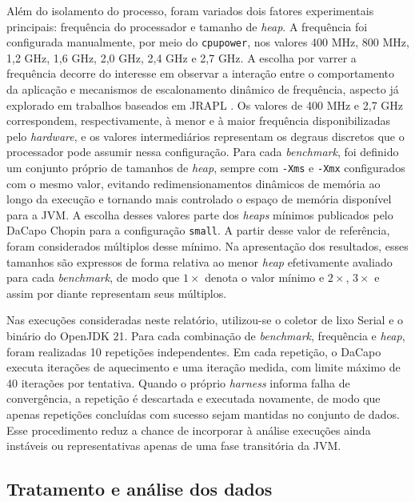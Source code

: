 Além do isolamento do processo, foram variados dois fatores experimentais
principais: frequência do processador e tamanho de \textit{heap}. A frequência
foi configurada manualmente, por meio do \texttt{cpupower}, nos valores
400 MHz, 800 MHz, 1{,}2 GHz, 1{,}6 GHz, 2{,}0 GHz, 2{,}4 GHz e 2{,}7 GHz. A
escolha por varrer a frequência decorre do interesse em observar a interação
entre o comportamento da aplicação e mecanismos de escalonamento dinâmico de
frequência, aspecto já explorado em trabalhos baseados em JRAPL \cite{jrapl}.
Os valores de 400 MHz e 2{,}7 GHz correspondem, respectivamente, à menor e à maior
frequência disponibilizadas pelo \textit{hardware}, e os
valores intermediários representam os degraus discretos que o processador pode
assumir nessa configuração. Para cada \textit{benchmark}, foi definido um
conjunto próprio de tamanhos de \textit{heap}, sempre com \texttt{-Xms} e
\texttt{-Xmx} configurados com o mesmo valor, evitando redimensionamentos
dinâmicos de memória ao longo da execução e tornando mais controlado o espaço
de memória disponível para a JVM. A escolha desses valores parte dos
\textit{heaps} mínimos publicados pelo DaCapo Chopin para a configuração
\texttt{small}. A partir desse valor de
referência, foram considerados múltiplos desse mínimo. Na apresentação
dos resultados, esses tamanhos são expressos de forma relativa ao menor
\textit{heap} efetivamente avaliado para cada \textit{benchmark}, de modo que
\(1\times\) denota o valor mínimo e \(2\times\), \(3\times\) e
assim por diante representam seus múltiplos.

Nas execuções consideradas neste relatório, utilizou-se o coletor de lixo Serial e
o binário do OpenJDK 21. Para cada combinação de \textit{benchmark}, frequência
e \textit{heap}, foram realizadas 10 repetições independentes. Em cada
repetição, o DaCapo executa iterações de aquecimento e uma iteração medida, com
limite máximo de 40 iterações por tentativa. Quando o próprio \textit{harness}
informa falha de convergência, a repetição é descartada e executada novamente,
de modo que apenas repetições concluídas com sucesso sejam mantidas no conjunto
de dados. Esse procedimento reduz a chance de incorporar à análise execuções
ainda instáveis ou representativas apenas de uma fase transitória da JVM.

\subsection{Tratamento e análise dos dados}

